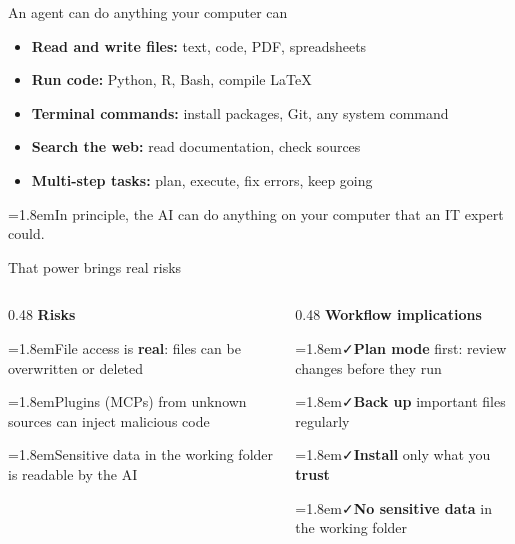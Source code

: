 \documentclass[aspectratio=169, 11pt, t]{beamer}
\newcommand{\yes}{\textcolor{seeblau}{\faCheck}}
\newcommand{\warn}{\textcolor{akzentrot}{\faExclamationTriangle}}
\newcommand{\hint}[2]{\par\noindent\hangindent=1.8em\hangafter=1\textcolor{seeblau}{#1}\quad #2\par}
\begin{document}
\begin{frame}{An agent can do anything your computer can}

\vfill
\begin{itemize}\setlength{\itemsep}{0.9em}
  \item \textbf{Read and write files:} text, code, PDF, spreadsheets
  \item \textbf{Run code:} Python, R, Bash, compile \LaTeX
  \item \textbf{Terminal commands:} install packages, Git, any system command
  \item \textbf{Search the web:} read documentation, check sources
  \item \textbf{Multi-step tasks:} plan, execute, fix errors, keep going
\end{itemize}
\vfill
\hint{\warn}{In principle, the AI can do anything on your computer that an IT expert could.}
\vfill

\end{frame}





\begin{frame}{That power brings real risks}

\begin{columns}[T]
  \begin{column}{0.48\textwidth}
    \textbf{Risks}\\[0.5em]
    \small
    \hint{\warn}{File access is \textbf{real}: files can be overwritten or deleted}
    \hint{\warn}{Plugins (MCPs) from unknown sources can inject malicious code}
    \hint{\warn}{Sensitive data in the working folder is readable by the AI}
  \end{column}
  \begin{column}{0.48\textwidth}
    \textbf{Workflow implications}\\[0.5em]
    \small
    \hint{\yes}{\textbf{Plan mode} first: review changes before they run}
    \hint{\yes}{\textbf{Back up} important files regularly}
    \hint{\yes}{\textbf{Install} only what you \textbf{trust}}
    \hint{\yes}{\textbf{No sensitive data} in the working folder}

  \end{column}
\end{columns}

\end{frame}
\end{document}
